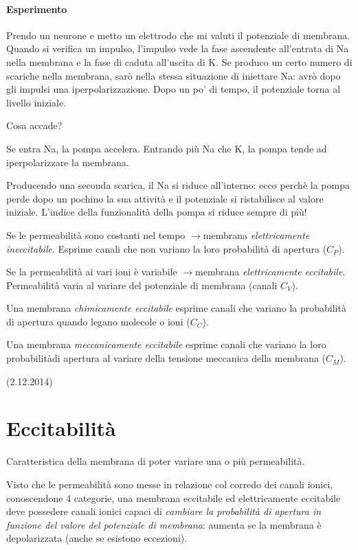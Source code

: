 \documentclass[a4paper,12pt]{article}
\newcommand{\lfreccia}{\ensuremath{\longrightarrow}}
\begin{document}
\paragraph{Esperimento}
Prendo un neurone e metto un elettrodo che mi valuti il potenziale di membrana. Quando si verifica un impulso, l'impulso vede la fase ascendente all'entrata di Na nella membrana e la fase di caduta all'uscita di K. Se produco un certo numero di scariche nella membrana, sarò nella stessa situazione di iniettare Na: avrò dopo gli impulsi una iperpolarizzazione. Dopo un po' di tempo, il potenziale torna al livello iniziale. 

Cosa accade?

Se entra Na, la pompa accelera. Entrando più Na che K, la pompa tende ad iperpolarizzare la membrana.

Producendo una seconda scarica, il Na si riduce all'interno: ecco perchè la pompa perde dopo un pochino la sua attività e il potenziale si ristabilisce al valore iniziale. L'indice della funzionalità della pompa si riduce sempre di più!

Se le permeabilità sono costanti nel tempo \lfreccia membrana \emph{elettricamente ineccitabile}. Esprime canali che non variano la loro probabilità di apertura ($C_{P}$).

Se la permeabilità ai vari ioni è variabile \lfreccia membrana \emph{elettricamente eccitabile}. Permeabilità varia al variare del potenziale di membrana (canali $C_{V}$).

Una membrana \emph{chimicamente eccitabile} esprime canali che variano la probabilità di apertura quando legano molecole o ioni ($C_{C}$).

Una membrana \emph{meccanicamente eccitabile}  esprime canali che variano la loro probabilitàdi apertura al variare della tensione meccanica della membrana ($C_{M}$).

(2.12.2014)
\section{Eccitabilità}
Caratteristica della membrana di poter variare una o più permeabilità. 

Visto che le permeabilità sono messe in relazione col corredo dei canali ionici, conoscendone 4 categorie, una membrana eccitabile ed elettricamente eccitabile deve possedere canali ionici capaci di \emph{cambiare la probabilità di apertura in funzione del valore del potenziale di membrana}: aumenta se la membrana è depolarizzata (anche se esistono eccezioni).
\end{document}
